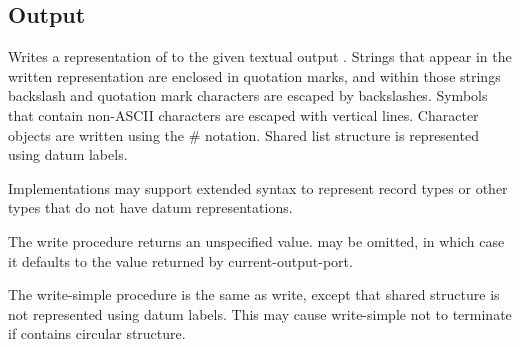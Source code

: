 \subsection{Output}
\label{outputsection}

\noindent \hbox{}
\vspace{-5ex}

\begin{entry}{%
}

Writes a representation of  to the given textual output
.  Strings
that appear in the written representation are enclosed in quotation marks, and
within those strings backslash and quotation mark characters are
escaped by backslashes.  Symbols that contain non-ASCII characters
are escaped with vertical lines.
Character objects are written using the {\cf \#\backwhack} notation.
Shared list structure is represented using datum labels.

Implementations may support extended syntax to represent record types or
other types that do not have datum representations.

The {\cf write} procedure returns an unspecified value.
 may be omitted, in which case it defaults to the value
returned by {\cf current-output-port}.

\end{entry}

\begin{entry}{%
}

The {\cf write-simple} procedure is the same as {\cf write}, except that shared structure is
not represented using datum labels.  This may cause {\cf write-simple} not to
terminate if  contains circular structure.

\end{entry}


